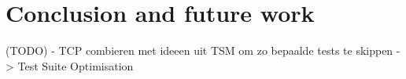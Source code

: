 \chapter{Conclusion and future work}

(TODO)
- TCP combieren met ideeen uit TSM om zo bepaalde tests te skippen -> Test Suite Optimisation
